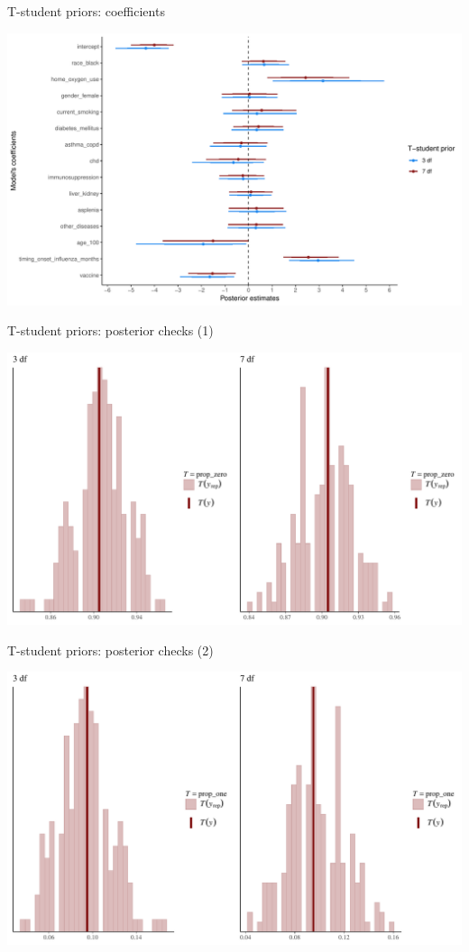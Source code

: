 \documentclass[ignorenonframetext,a4paper]{beamer}
\begin{document}
\begin{frame}{T-student priors: coefficients}

\includegraphics{DB_presentation_case_study_files/figure-beamer/unnamed-chunk-34-1.pdf}

\end{frame}

\begin{frame}{T-student priors: posterior checks (1)}

\includegraphics{DB_presentation_case_study_files/figure-beamer/unnamed-chunk-35-1.pdf}

\end{frame}

\begin{frame}{T-student priors: posterior checks (2)}

\includegraphics{DB_presentation_case_study_files/figure-beamer/unnamed-chunk-36-1.pdf}

\end{frame}
\end{document}
